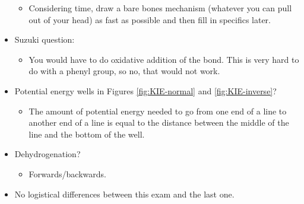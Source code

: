 \documentclass[../notes.tex]{subfiles}
\begin{document}
\begin{itemize}
\begin{itemize}
        \item Considering time, draw a bare bones mechanism (whatever you can pull out of your head) as fast as possible and then fill in specifics later.
    \end{itemize}
    \item Suzuki question:
    \begin{itemize}
        \item You would have to do oxidative addition of the  bond. This is very hard to do with a phenyl group, so no, that would not work.
    \end{itemize}
    \item Potential energy wells in Figures \ref{fig:KIE-normal} and \ref{fig:KIE-inverse}?
    \begin{itemize}
        \item The amount of potential energy needed to go from one end of a line to another end of a line is equal to the distance between the middle of the line and the bottom of the well.
    \end{itemize}
    \item Dehydrogenation?
    \begin{itemize}
        \item Forwards/backwards.
    \end{itemize}
    \item No logistical differences between this exam and the last one.
\end{itemize}
\end{document}
